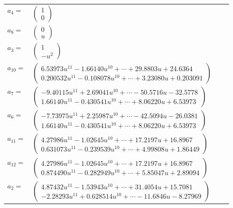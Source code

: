 \documentclass[1p]{elsarticle_modified}
\theoremstyle{definition}
\begin{document}
\begin{tabular}{m{7pt} m{180pt} m{7pt} m{180pt} }
\flushright $a_{4}=$&$\begin{pmatrix}1\\0\end{pmatrix}$ \\
\flushright $a_{8}=$&$\begin{pmatrix}0\\u\end{pmatrix}$ \\
\flushright $a_{3}=$&$\begin{pmatrix}1\\- u^2\end{pmatrix}$ \\
\flushright $a_{10}=$&$\begin{pmatrix}6.53973 u^{11}-1.66140 u^{10}+\cdots+29.8803 u+24.6364\\0.200532 u^{11}-0.108078 u^{10}+\cdots+3.23080 u+0.203091\end{pmatrix}$ \\
\flushright $a_{7}=$&$\begin{pmatrix}-9.40115 u^{11}+2.69041 u^{10}+\cdots-50.5716 u-32.5778\\1.66140 u^{11}-0.430541 u^{10}+\cdots+8.06220 u+6.53973\end{pmatrix}$ \\
\flushright $a_{6}=$&$\begin{pmatrix}-7.73975 u^{11}+2.25987 u^{10}+\cdots-42.5094 u-26.0381\\1.66140 u^{11}-0.430541 u^{10}+\cdots+8.06220 u+6.53973\end{pmatrix}$ \\
\flushright $a_{11}=$&$\begin{pmatrix}4.27986 u^{11}-1.02645 u^{10}+\cdots+17.2197 u+16.8967\\0.631073 u^{11}-0.239539 u^{10}+\cdots+4.99808 u+1.86449\end{pmatrix}$ \\
\flushright $a_{12}=$&$\begin{pmatrix}4.27986 u^{11}-1.02645 u^{10}+\cdots+17.2197 u+16.8967\\0.874490 u^{11}-0.282949 u^{10}+\cdots+5.85047 u+2.89094\end{pmatrix}$ \\
\flushright $a_{2}=$&$\begin{pmatrix}4.87432 u^{11}-1.53943 u^{10}+\cdots+31.4054 u+15.7081\\-2.28293 u^{11}+0.628514 u^{10}+\cdots-11.6846 u-8.27969\end{pmatrix}$ \\

\end{tabular}
\end{document}
